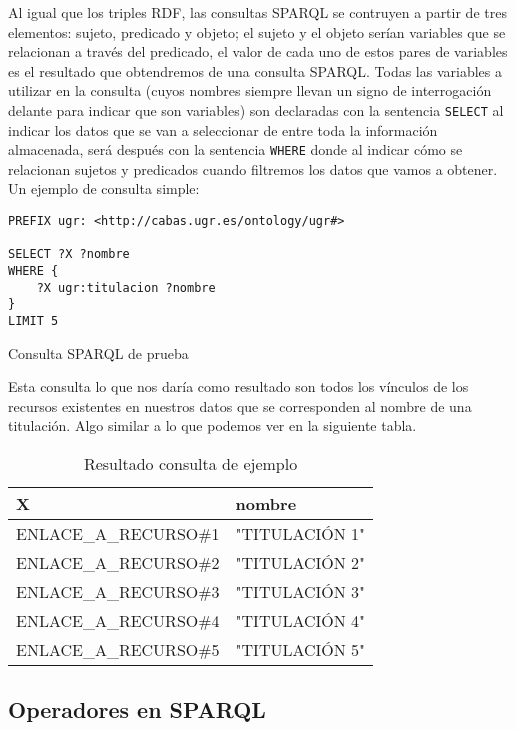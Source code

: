 \bigskip
Al igual que los triples {\sf RDF}, las consultas {\sf SPARQL} se contruyen a partir de tres elementos: sujeto, predicado y objeto; el sujeto y el objeto serían variables que se relacionan a través del predicado, el valor de cada uno de estos pares de variables es el resultado que obtendremos de una consulta {\sf SPARQL}. Todas las variables a utilizar en la consulta (cuyos nombres siempre llevan un signo de interrogación delante para indicar que son variables) son declaradas con la sentencia {\tt SELECT} al indicar los datos que se van a seleccionar de entre toda la información almacenada, será después con la sentencia {\tt WHERE} donde al indicar cómo se relacionan sujetos y predicados cuando filtremos los datos que vamos a obtener. Un ejemplo de consulta simple: 

\begin{listing}[!ht]
\begin{verbatim}
PREFIX ugr: <http://cabas.ugr.es/ontology/ugr#>

SELECT ?X ?nombre
WHERE {
    ?X ugr:titulacion ?nombre
}
LIMIT 5
\end{verbatim}
\caption{Consulta {\sf SPARQL} de prueba}
\end{listing}

Esta consulta lo que nos daría como resultado son todos los vínculos de los recursos existentes en nuestros datos que se corresponden al nombre de una titulación. Algo similar a lo que podemos ver en la siguiente tabla.

\begin{table}[!ht]
	\centering
	\begin{tabular}{|p{}|p{}|}
		\hline
		\textbf{X} &
		\textbf{nombre}
		\\ \hline
		ENLACE\_A\_RECURSO\#1&
		"TITULACIÓN 1"
		\\ \hline
		ENLACE\_A\_RECURSO\#2&
		"TITULACIÓN 2"
		\\ \hline
		ENLACE\_A\_RECURSO\#3&
		"TITULACIÓN 3"
		\\ \hline
		ENLACE\_A\_RECURSO\#4&
		"TITULACIÓN 4"
		\\ \hline
		ENLACE\_A\_RECURSO\#5&
		"TITULACIÓN 5"
		\\ \hline
	\end{tabular}
	\caption{Resultado consulta de ejemplo}
	\label{consulta-ejemplo}
\end{table}

\subsection{Operadores en SPARQL}

